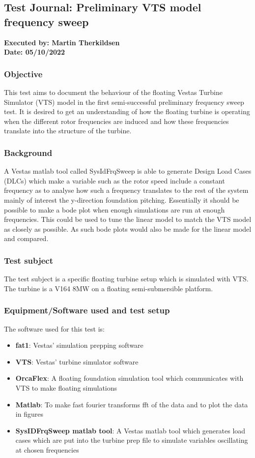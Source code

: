 \subsection{Test Journal: Preliminary VTS model frequency sweep} \label{app:tj_00}

\textbf{Executed by: Martin Therkildsen} \\
\textbf{Date: 05/10/2022}

\subsubsection*{Objective}
This test aims to document the behaviour of the floating Vestas Turbine Simulator (VTS) model in the first semi-successful preliminary frequency sweep test. It is desired to get an understanding of how the floating turbine is operating when the different rotor frequencies are induced and how these frequencies translate into the structure of the turbine. 

\subsubsection*{Background}
A Vestas matlab tool called SysIdFrqSweep is able to generate Design Load Cases (DLCs) which make a variable such as the rotor speed include a constant frequency as to analyse how such a frequency translates to the rest of the system mainly of interest the y-direction foundation pitching. Essentially it should be possible to make a bode plot when enough simulations are run at enough frequencies. This could be used to tune the linear model to match the VTS model as closely as possible. As such bode plots would also be made for the linear model and compared.

\subsubsection*{Test subject}
The test subject is a specific floating turbine setup which is simulated with VTS. The turbine is a V164 8MW on a floating semi-submersible platform.

\subsubsection*{Equipment/Software used and test setup}
The software used for this test is:
\begin{itemize}
	\item \textbf{fat1}: Vestas' simulation prepping software
	\item \textbf{VTS}: Vestas' turbine simulator software
	\item \textbf{OrcaFlex}: A floating foundation simulation tool which communicates with VTS to make floating simulations
	\item \textbf{Matlab}: To make fast fourier transforms fft of the data and to plot the data in figures
	\item \textbf{SysIDFrqSweep matlab tool}: A Vestas matlab tool which generates load cases which are put into the turbine prep file to simulate variables oscillating at chosen frequencies
\end{itemize}



